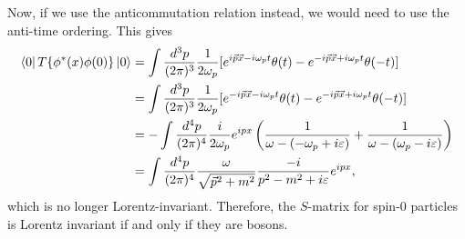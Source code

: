 \documentclass[11pt]{article}
\theoremstyle{definition}
\begin{document}
Now, if we use the anticommutation relation instead, we would need to use the anti-time ordering. This gives
\begin{equation}
    \begin{aligned}
        \bra{0}T\{\phi^*(x)\phi(0)\}\ket{0} &= \int \frac{d^3p}{(2\pi)^3}\frac{1}{2\omega_p} [e^{i\vec{p}\vec{x}-i\omega_pt}\theta(t) - e^{-i\vec{p}\vec{x}+i\omega_pt}\theta(-t)] \\
        &= \int \frac{d^3p}{(2\pi)^3}\frac{1}{2\omega_p} [e^{-i\vec{p}\vec{x}-i\omega_pt}\theta(t) - e^{-i\vec{p}\vec{x}+i\omega_pt}\theta(-t)]\\
        &= -\int \frac{d^4p}{(2\pi)^4}\frac{i}{2\omega_p} e^{ipx}\left(\frac{1}{\omega-(-\omega_p+i\varepsilon)} + \frac{1}{\omega-(\omega_p-i\varepsilon)} \right) \\
        &= \int \frac{d^4p}{(2\pi)^4}\frac{\omega}{\sqrt{\vec{p}^2+m^2}}\frac{-i}{p^2-m^2+i\varepsilon}e^{ipx},
    \end{aligned}
\end{equation}
which is no longer Lorentz-invariant. Therefore, the $S$-matrix for spin-0 particles is Lorentz invariant if and only if they are bosons.
\end{document}
